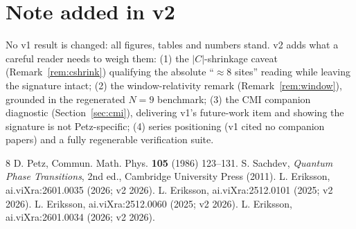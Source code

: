 \documentclass[11pt]{article}
\theoremstyle{remark}
\begin{document}
\section*{Note added in v2}
No v1 result is changed: all figures, tables and numbers stand. v2 adds
what a careful reader needs to weigh them: (1) the $|C|$-shrinkage caveat
(Remark~\ref{rem:cshrink}) qualifying the absolute ``$\approx 8$ sites''
reading while leaving the signature intact; (2) the window-relativity
remark (Remark~\ref{rem:window}), grounded in the regenerated $N = 9$
benchmark; (3) the CMI companion diagnostic (Section~\ref{sec:cmi}),
delivering v1's future-work item and showing the signature is not
Petz-specific; (4) series positioning (v1 cited no companion papers) and
a fully regenerable verification suite.

\begin{thebibliography}{8}
 D. Petz, Commun. Math. Phys. \textbf{105} (1986) 123--131.
 S. Sachdev, \emph{Quantum Phase Transitions}, 2nd ed.,
Cambridge University Press (2011).
 L. Eriksson, ai.viXra:2601.0035 (2026; v2 2026).
 L. Eriksson, ai.viXra:2512.0101 (2025; v2 2026).
 L. Eriksson, ai.viXra:2512.0060 (2025; v2 2026).
 L. Eriksson, ai.viXra:2601.0034 (2026; v2 2026).
\end{thebibliography}
\end{document}
